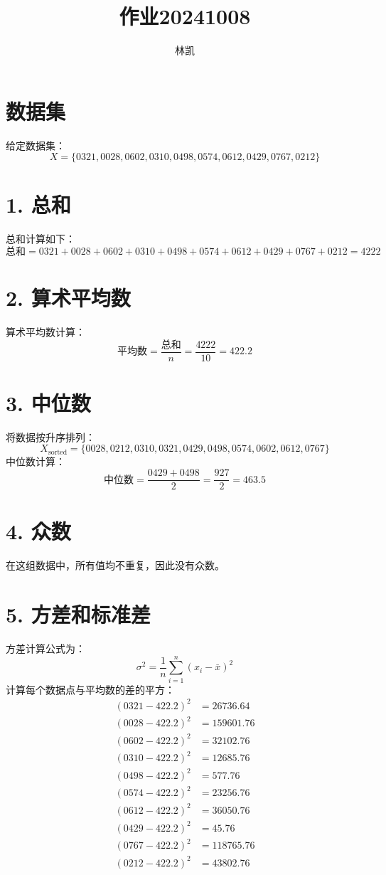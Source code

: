 \documentclass{article}
\begin{document}
\title{作业20241008}
\author{林凯}
\date{}
\maketitle

\section{数据集}

给定数据集：
\[
X = \{ 0321, 0028, 0602, 0310, 0498, 0574, 0612, 0429, 0767, 0212 \}
\]

\section{1. 总和}

总和计算如下：
\[
\text{总和} = 0321 + 0028 + 0602 + 0310 + 0498 + 0574 + 0612 + 0429 + 0767 + 0212 = 4222
\]

\section{2. 算术平均数}

算术平均数计算：
\[
\text{平均数} = \frac{\text{总和}}{n} = \frac{4222}{10} = 422.2
\]

\section{3. 中位数}

将数据按升序排列：
\[
X_{\text{sorted}} = \{ 0028, 0212, 0310, 0321, 0429, 0498, 0574, 0602, 0612, 0767 \}
\]
中位数计算：
\[
\text{中位数} = \frac{0429 + 0498}{2} = \frac{927}{2} = 463.5
\]

\section{4. 众数}

在这组数据中，所有值均不重复，因此没有众数。

\section{5. 方差和标准差}

方差计算公式为：
\[
\sigma^2 = \frac{1}{n} \sum_{i=1}^{n} (x_i - \bar{x})^2
\]
计算每个数据点与平均数的差的平方：
\[
\begin{align*}
(0321 - 422.2)^2 & = 26736.64 \\
(0028 - 422.2)^2 & = 159601.76 \\
(0602 - 422.2)^2 & = 32102.76 \\
(0310 - 422.2)^2 & = 12685.76 \\
(0498 - 422.2)^2 & = 577.76 \\
(0574 - 422.2)^2 & = 23256.76 \\
(0612 - 422.2)^2 & = 36050.76 \\
(0429 - 422.2)^2 & = 45.76 \\
(0767 - 422.2)^2 & = 118765.76 \\
(0212 - 422.2)^2 & = 43802.76 \\
\end{align*}
\]
\end{document}
